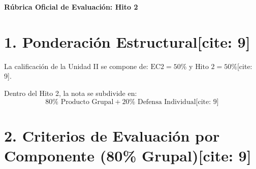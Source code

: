 \documentclass[11pt, a4paper, landscape]{article}
\begin{document}
\begin{center}
    \Large\textbf{\textcolor{ucbblue}{Rúbrica Oficial de Evaluación: Hito 2}}\\[0.2cm]
\end{center}

\section*{1. Ponderación Estructural[cite: 9]}
La calificación de la Unidad II se compone de: $\text{EC2} = 50\%$ y $\text{Hito 2} = 50\%$[cite: 9].

Dentro del Hito 2, la nota se subdivide en:
\begin{equation*}
    \boxed{ 80\% \text{ Producto Grupal} + 20\% \text{ Defensa Individual} } \text{[cite: 9]}
\end{equation*}

\section*{2. Criterios de Evaluación por Componente (80\% Grupal)[cite: 9]}
\end{document}
